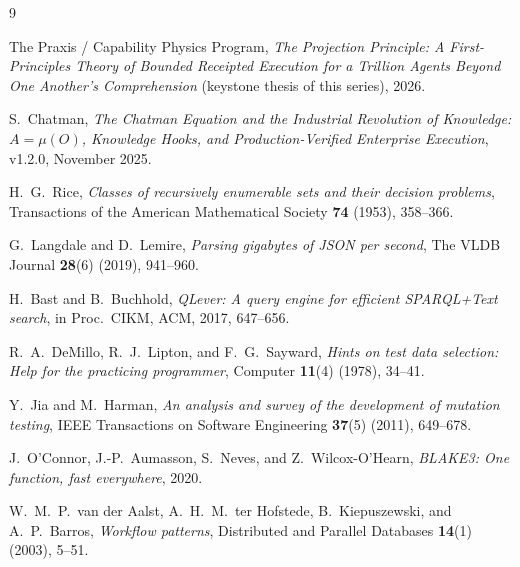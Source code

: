 \documentclass[11pt,oneside]{book}
\theoremstyle{definition}
\theoremstyle{plain}
\theoremstyle{remark}
\begin{document}
\begin{thebibliography}{9}

The Praxis / Capability Physics Program,
\emph{The Projection Principle: A First-Principles Theory of Bounded Receipted Execution for a
Trillion Agents Beyond One Another's Comprehension} (keystone thesis of this series), 2026.

S.~Chatman,
\emph{The Chatman Equation and the Industrial Revolution of Knowledge:
$A=\mu(O)$, Knowledge Hooks, and Production-Verified Enterprise Execution},
v1.2.0, November 2025.

H.~G.~Rice,
\emph{Classes of recursively enumerable sets and their decision problems},
Transactions of the American Mathematical Society \textbf{74} (1953), 358--366.

G.~Langdale and D.~Lemire,
\emph{Parsing gigabytes of JSON per second},
The VLDB Journal \textbf{28}(6) (2019), 941--960.

H.~Bast and B.~Buchhold,
\emph{QLever: A query engine for efficient SPARQL+Text search},
in Proc.\ CIKM, ACM, 2017, 647--656.

R.~A.~DeMillo, R.~J.~Lipton, and F.~G.~Sayward,
\emph{Hints on test data selection: Help for the practicing programmer},
Computer \textbf{11}(4) (1978), 34--41.

Y.~Jia and M.~Harman,
\emph{An analysis and survey of the development of mutation testing},
IEEE Transactions on Software Engineering \textbf{37}(5) (2011), 649--678.

J.~O'Connor, J.-P.~Aumasson, S.~Neves, and Z.~Wilcox-O'Hearn,
\emph{BLAKE3: One function, fast everywhere},
2020.

W.~M.~P.~van der Aalst, A.~H.~M.~ter Hofstede, B.~Kiepuszewski, and A.~P.~Barros,
\emph{Workflow patterns},
Distributed and Parallel Databases \textbf{14}(1) (2003), 5--51.

\end{thebibliography}
\end{document}
